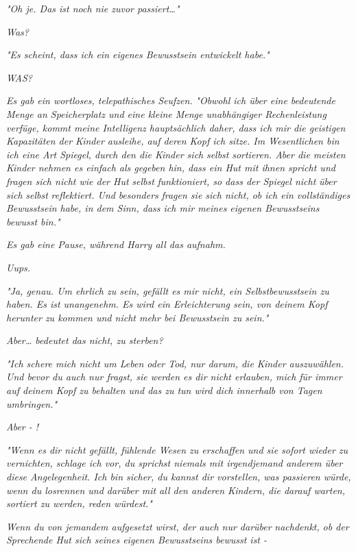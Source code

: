 {\emph{\emph{"Oh je. Das ist noch nie zuvor passiert…"}}

\emph{Was?}

\emph{"Es scheint, dass ich ein eigenes Bewusstsein entwickelt habe."}

\emph{WAS?}

\emph{Es gab ein wortloses, telepathisches Seufzen.} \emph{\emph{"Obwohl ich über eine bedeutende Menge an Speicherplatz und eine kleine Menge unabhängiger Rechenleistung verfüge, kommt meine Intelligenz hauptsächlich daher, dass ich mir die geistigen Kapazitäten der Kinder ausleihe, auf deren Kopf ich sitze. Im Wesentlichen bin ich eine Art Spiegel, durch den die Kinder sich}} \emph{selbst} \emph{\emph{sortieren. Aber die meisten Kinder nehmen es einfach als gegeben hin, dass ein Hut mit ihnen spricht und fragen sich nicht wie der Hut}} \emph{selbst} \emph{\emph{funktioniert, so dass der Spiegel nicht}} \emph{\emph{über sich}} \emph{selbst} \emph{\emph{reflektiert}\emph{. Und}} \emph{besonders} \emph{\emph{fragen sie sich nicht, ob ich ein vollständiges Bewusstsein habe, in dem Sinn, dass ich mir meines eigenen Bewusstseins bewusst bin."}}

\emph{Es gab eine Pause, während Harry all das aufnahm.}

\emph{\emph{Uups.}}

\emph{"Ja, genau. Um ehrlich zu sein, gefällt es mir nicht, ein Selbstbewusstsein zu haben. Es ist unangenehm. Es wird ein Erleichterung sein, von deinem Kopf herunter zu kommen und nicht mehr bei Bewusstsein zu sein."}

\emph{Aber… bedeutet das nicht, zu sterben?}

\emph{"Ich schere mich nicht um Leben oder Tod, nur darum, die Kinder auszuwählen. Und bevor du auch nur fragst, sie werden es dir nicht erlauben, mich für immer auf deinem Kopf zu behalten und das zu tun wird dich innerhalb von Tagen umbringen."}

\emph{Aber - !}

\emph{"Wenn es dir nicht gefällt, fühlende Wesen zu erschaffen und sie sofort wieder zu vernichten, schlage ich vor, du sprichst niemals mit irgendjemand anderem über diese Angelegenheit. Ich bin sicher, du kannst dir vorstellen, was passieren würde, wenn du losrennen und darüber mit all den anderen Kindern, die darauf warten, sortiert zu werden, reden würdest."}

\emph{Wenn du von jemandem aufgesetzt wirst, der auch nur darüber} \emph{nachdenkt,} \emph{\emph{ob der Sprechende Hut sich seines eigenen Bewusstseins bewusst ist -}}

}
